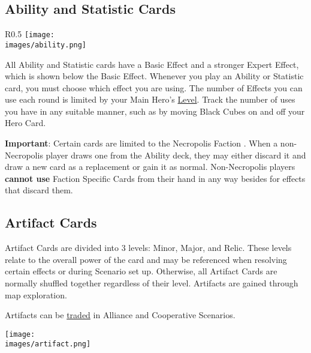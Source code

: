 \clearpage
\subsection*{\hypertarget{Ability}{Ability and Statistic Cards}}
\begin{wrapfigure}{R}{0.5\textwidth}
    \texttt{[image: \\images/ability.png]}
\end{wrapfigure}

All Ability and Statistic cards have a Basic Effect and a stronger Expert  Effect, which is shown below the Basic Effect.
Whenever you play an Ability or Statistic card, you must choose which effect you are using.
The number of  Effects you can use each round is limited by your Main Hero’s \hyperlink{Level}{Level}.
Track the number of uses you have in any suitable manner, such as by moving Black Cubes on and off your Hero Card.\par
\textbf{Important}: Certain cards are limited to the Necropolis Faction .
When a non-Necropolis player draws one from the Ability deck, they may either discard it and draw a new card as a replacement or gain it as normal.
Non-Necropolis players \textbf{cannot use} Faction Specific Cards from their hand in any way besides for effects that discard them.

\subsection*{Artifact Cards}
Artifact Cards are divided into 3 levels: Minor, Major, and Relic.
These levels relate to the overall power of the card and may be referenced when resolving certain effects or during Scenario set up.
Otherwise, all Artifact Cards are normally shuffled together regardless of their level.
Artifacts are gained through map exploration.\par
Artifacts can be \hyperlink{Trading}{traded} in Alliance and Cooperative Scenarios.\par
\texttt{[image: \\images/artifact.png]}


\clearpage

